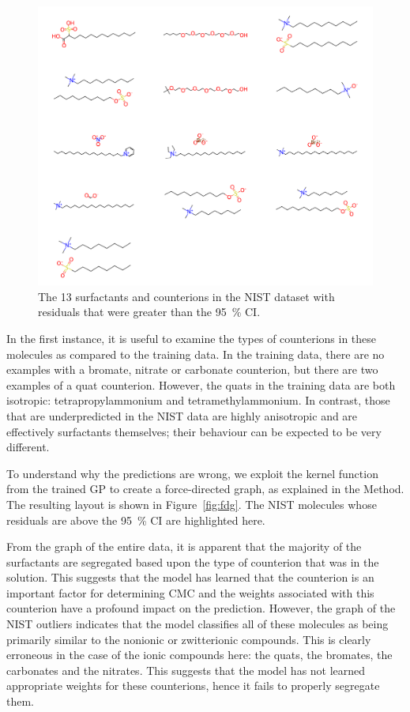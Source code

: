 \begin{figure}
    \includegraphics[width=\textwidth]{images/nist-underpred.pdf}
    \caption{The 13 surfactants and counterions in the NIST dataset with residuals
        that were greater than the \SI{95}{\%} CI.}
    \label{fig:nist-underpred}
\end{figure}

In the first instance, it is useful to examine the types of counterions in these
molecules as compared to the training data. In the training data, there are no
examples with a bromate, nitrate or carbonate counterion, but there are two
examples of a quat counterion. However, the quats in the training data are both
isotropic: tetrapropylammonium and tetramethylammonium. In contrast, those that
are underpredicted in the NIST data are highly anisotropic and are effectively
surfactants themselves; their behaviour can be expected to be very different.

To understand why the predictions are wrong, we exploit the kernel function from
the trained GP to create a force-directed graph, as explained in the Method. The
resulting layout is shown in Figure~\ref{fig:fdg}. The NIST molecules whose
residuals are above the \SI{95}{\%} CI are highlighted here.

From the graph of the entire data, it is apparent that the majority of the
surfactants are segregated based upon the type of counterion that was in the
solution. This suggests that the model has learned that the counterion is an
important factor for determining CMC and the weights associated with this
counterion have a profound impact on the prediction. However, the graph of the
NIST outliers indicates that the model classifies all of these molecules as
being primarily similar to the nonionic or zwitterionic compounds. This is
clearly erroneous in the case of the ionic compounds here: the quats, the
bromates, the carbonates and the nitrates. This suggests that the model has not
learned appropriate weights for these counterions, hence it fails to properly
segregate them.

